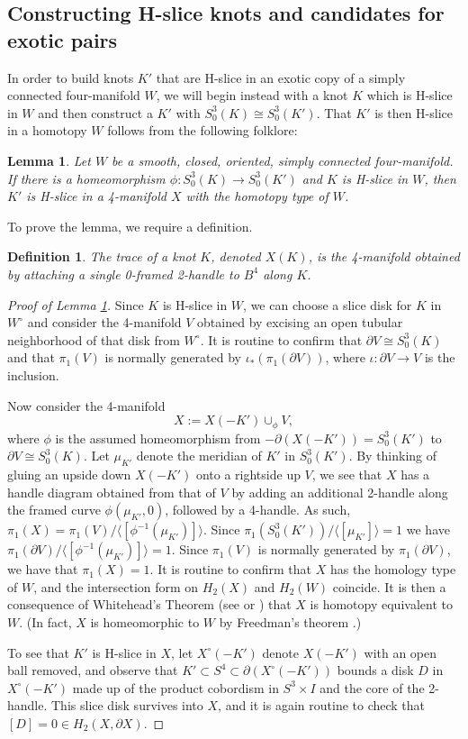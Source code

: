 \documentclass [11pt]{amsart}
\newtheorem {lemma}[theorem]{Lemma}
\newtheorem {definition}[theorem]{Definition}
\theoremstyle{remark}
\def\Wo{W^{\circ}}
\begin{document}
\subsection{Constructing H-slice knots and candidates for exotic pairs}
 In order to build knots $K'$ that are H-slice in an exotic copy of a simply connected four-manifold $W$, we will begin instead with a knot $K$ which is H-slice in $W$ and then construct a $K'$ with $S^3_0(K)\cong S^3_0(K')$. That $K'$ is then H-slice in a homotopy  $W$ follows from the following folklore:

\begin{lemma}\label{lem:slicehomeo}
Let $W$ be a smooth, closed, oriented, simply connected four-manifold. If there is a homeomorphism  $\phi:S^3_0(K)\to S^3_0(K')$ and $K$ is H-slice in $W$, then $K'$ is H-slice in a 4-manifold $X$ with the homotopy type of $W$. 
\end{lemma}

To prove the lemma, we require a definition. 
\begin{definition}
The \emph{trace} of a knot $K$, denoted $X(K)$, is the 4-manifold obtained by attaching a single 0-framed 2-handle to $B^4$ along $K$. 
\end{definition}
\begin{proof}[Proof of Lemma \ref{lem:slicehomeo}]
Since $K$ is H-slice in $W$, we can choose a slice disk for $K$ in $\Wo$ and consider the 4-manifold $V$ obtained by excising an open tubular neighborhood of that disk from $\Wo$. It is routine to confirm that $\partial V\cong S^3_0(K)$ and that $\pi_1(V)$ is normally generated by $\iota_*(\pi_1(\partial V))$, where $\iota: \partial V \to V$ is the inclusion.

Now consider the 4-manifold $$X:=X(-K')\cup_\phi V,$$ where $\phi$ is the assumed homeomorphism from $-\partial(X(-K')) = S^3_0(K')$ to $\partial V \cong S^3_0(K)$. Let $\mu_{K'}$ denote the meridian of $K'$ in $S^3_0(K')$. By thinking of gluing an upside down $X(-K')$ onto a rightside up $V$, we see that $X$ has a handle diagram obtained from that of $V$ by adding an additional 2-handle along the framed curve $\phi(\mu_{K'}, 0)$, followed by a 4-handle. As such, $\pi_1(X)=\pi_1(V)/\langle[\phi^{-1}(\mu_{K'})]\rangle$. Since $\pi_1(S^3_0(K'))/\langle[\mu_{K'}]\rangle=1$ we have  $\pi_1(\partial V)/\langle[\phi^{-1}(\mu_{K'})]\rangle=1$. Since $\pi_1(V)$ is normally generated by $\pi_1(\partial V)$, we have that $\pi_1(X)=1$. It is routine to confirm that $X$ has the homology type of $W$, and the intersection form on $H_2(X)$ and $H_2(W)$ coincide. It is then a consequence of Whitehead's Theorem (see \cite[p.103, Theorem 1.5]{MilnorSBF}  or \cite[Theorem 1.2.25]{GS}) that $X$ is homotopy equivalent to $W$. (In fact, $X$ is homeomorphic to $W$ by Freedman's theorem \cite{Freedman}.)


To see that $K'$ is H-slice in $X$, let $X^\circ(-K')$ denote $X(-K')$ with an open ball removed, and observe that $K'\subset S^4\subset \partial(X^\circ(-K'))$ bounds a disk $D$ in $X^\circ (-K')$ made up of the product cobordism in $S^3\times I$ and the core of the 2-handle. This slice disk survives into $X$, and it is again routine to check that $[D]=0\in H_2(X,\partial X)$.
\end{proof}
\end{document}
